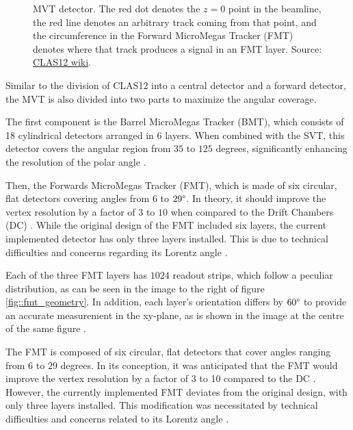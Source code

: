     \begin{figure}[b!]
        \centering{}
        \caption[MVT detector.]{MVT detector.
        The red dot denotes the $z=0$ point in the beamline, the red line denotes an arbitrary track coming from that point, and the circumference in the Forward MicroMegas Tracker (FMT) denotes where that track produces a signal in an FMT layer.
        Source: \hyperlink{jlab.org/physics/hall-b/clas12}{CLAS12 wiki}.}
        \label{fig::mvt}
    \end{figure}

    Similar to the division of CLAS12 into a central detector and a forward detector, the MVT is also divided into two parts to maximize the angular coverage.

    The first component is the Barrel MicroMegas Tracker (BMT), which consists of 18 cylindrical detectors arranged in 6 layers.
    When combined with the SVT, this detector covers the angular region from $35$ to $125$ degrees, significantly enhancing the resolution of the polar angle \cite{acker2020mvt}.

    Then, the Forwards MicroMegas Tracker (FMT), which is made of six circular, flat detectors covering angles from $6$ to $29\degree$.
    In theory, it should improve the vertex resolution by a factor of $3$ to $10$ when compared to the Drift Chambers (DC) \cite{aune2009}.
    While the original design of the FMT included six layers, the current implemented detector has only three layers installed.
    This is due to technical difficulties and concerns regarding its Lorentz angle \cite{konczykowski2010}.

    Each of the three FMT layers has $1024$ readout strips, which follow a peculiar distribution, as can be seen in the image to the right of figure \ref{fig::fmt_geometry}.
    In addition, each layer's orientation differs by $60\degree$ to provide an accurate measurement in the xy-plane, as is shown in the image at the centre of the same figure \cite{acker2020mvt}.

    The FMT is composed of six circular, flat detectors that cover angles ranging from $6$ to $29$ degrees.
    In its conception, it was anticipated that the FMT would improve the vertex resolution by a factor of 3 to 10 compared to the DC \cite{aune2009}.
    However, the currently implemented FMT deviates from the original design, with only three layers installed.
    This modification was necessitated by technical difficulties and concerns related to its Lorentz angle \cite{konczykowski2010}.

